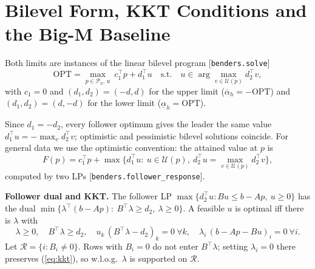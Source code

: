 \section{Bilevel Form, KKT Conditions and the Big-M Baseline}
\label{app:bilevel}
Both limits are instances of the linear bilevel program [\texttt{benders.solve}]
\begin{equation}
\mathrm{OPT}=\max_{p\in\mathcal P_h,\,u}\ c_1^\top p+d_1^\top u\quad\text{s.t.}\quad
u\in\arg\max_{v\in\mathcal U(p)} d_2^\top v,
\label{eq:bilevel}
\end{equation}
with $c_1=0$ and $(d_1,d_2)=(-d,d)$ for the upper limit ($\overline\alpha_h=-\mathrm{OPT}$) and
$(d_1,d_2)=(d,-d)$ for the lower limit ($\underline\alpha_h=\mathrm{OPT}$).
\begin{remark}\label{rem:optimistic}
Since $d_1=-d_2$, every follower optimum gives the leader the same value
$d_1^\top u=-\max_{v}d_2^\top v$; optimistic and pessimistic bilevel solutions coincide. For
general data we use the optimistic convention: the attained value at $p$ is
\begin{equation}
F(p)=c_1^\top p+\max\{d_1^\top u:\ u\in\mathcal U(p),\ d_2^\top u=\max_{v\in\mathcal U(p)}d_2^\top v\},
\label{eq:Fp}
\end{equation}
computed by two LPs [\texttt{benders.follower\_response}].
\end{remark}
\textbf{Follower dual and KKT.} The follower LP $\max\{d_2^\top u: Bu\le b-Ap,\ u\ge0\}$ has the dual
$\min\{\lambda^\top(b-Ap):\ B^\top\lambda\ge d_2,\ \lambda\ge0\}$. A feasible $u$ is optimal iff
there is $\lambda$ with
\begin{equation}
\lambda\ge0,\quad B^\top\lambda\ge d_2,\quad u_k\,(B^\top\lambda-d_2)_k=0\ \forall k,\quad
\lambda_i\,(b-Ap-Bu)_i=0\ \forall i .
\label{eq:kkt}
\end{equation}
Let $\mathcal R=\{i: B_i\neq0\}$. Rows with $B_i=0$ do not enter $B^\top\lambda$; setting
$\lambda_i=0$ there preserves (\ref{eq:kkt}), so w.l.o.g.\ $\lambda$ is supported on $\mathcal R$.

